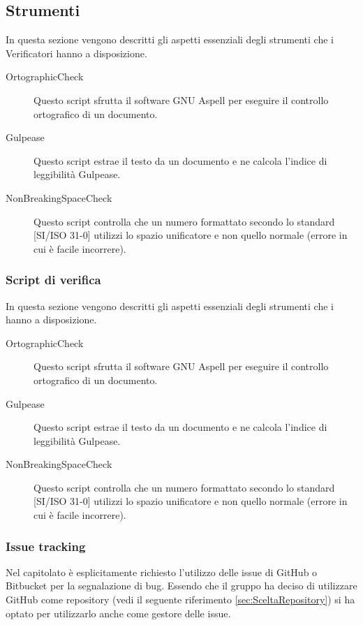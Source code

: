 	\subsection{Strumenti}
		In questa sezione vengono descritti gli aspetti essenziali degli strumenti che i Verificatori hanno a disposizione.
		\begin{description}
			\item[OrtographicCheck] Questo script sfrutta il software GNU Aspell per eseguire il controllo ortografico di un documento.
			\item[Gulpease] Questo script estrae il testo da un documento e ne calcola l'indice di leggibilità Gulpease.
			\item[NonBreakingSpaceCheck] Questo script controlla che un numero formattato secondo lo standard [SI/ISO 31-0] utilizzi lo spazio unificatore e non quello normale (errore in cui è facile incorrere).
		\end{description}
		\subsubsection{Script di verifica}
			In questa sezione vengono descritti gli aspetti essenziali degli strumenti che i  hanno a disposizione.
			\begin{description}
				\item[OrtographicCheck] Questo script sfrutta il software GNU Aspell per eseguire il controllo ortografico di un documento.
				\item[Gulpease] Questo script estrae il testo da un documento e ne calcola l'indice di leggibilità Gulpease.
				\item[NonBreakingSpaceCheck] Questo script controlla che un numero formattato secondo lo standard [SI/ISO 31-0] utilizzi lo spazio unificatore e non quello normale (errore in cui è facile incorrere).
			\end{description}
		\subsubsection{Issue tracking}
			Nel capitolato è esplicitamente richiesto l'utilizzo delle issue di GitHub o Bitbucket per la segnalazione di bug. Essendo che il gruppo \groupname{} ha deciso di utilizzare GitHub come repository (vedi il seguente riferimento \autoref{sec:SceltaRepository}) si ha optato per utilizzarlo anche come gestore delle issue.
